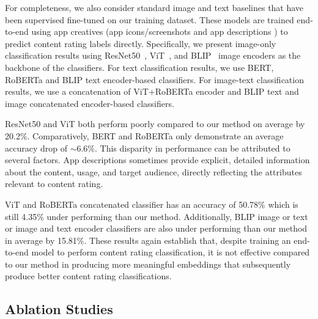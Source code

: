 For completeness, we also consider standard image and text baselines that have been supervised fine-tuned on our training dataset. These models are trained end-to-end using app creatives (app icons/screenshots and app descriptions ) to predict content rating labels directly. 
Specifically, we present image-only classification results using ResNet50~\cite{he2016deep}, ViT~\cite{dosovitskiy2020image}, and BLIP~\cite{li2022blip} image encoders as the backbone of the classifiers. For text classification results, we use BERT, RoBERTa and BLIP text encoder-based classifiers. For image-text classification results, we use a concatenation of ViT+RoBERTa encoder and BLIP text and image concatenated encoder-based classifiers.


ResNet50 and ViT both perform poorly compared to our method on average by 20.2\%. Comparatively, BERT and RoBERTa only demonstrate an average accuracy drop of $\sim$6.6\%. This disparity in performance can be attributed to several factors. App descriptions sometimes provide explicit, detailed information about the content, usage, and target audience, directly reflecting the attributes relevant to content rating. 

ViT and RoBERTa concatenated classifier has an accuracy of 50.78\% which is still 4.35\% under performing than our method. Additionally, BLIP image or text or image and text encoder classifiers are also under performing than our method in average by 15.81\%. These results again establish that, despite training an end-to-end model to perform content rating classification, it is not effective compared to our method in producing more meaningful embeddings that subsequently produce better content rating classifications.


\subsection{Ablation Studies}
\label{Subsec: ablations}

 \\


